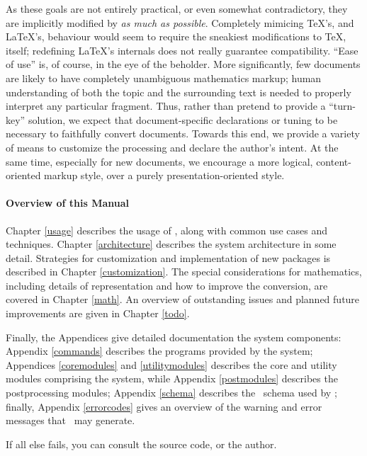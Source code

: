\documentclass{book}
\begin{document}
As these goals are not entirely practical, or even somewhat contradictory,
they are implicitly modified by \emph{as much as possible}.
Completely mimicing \TeX's, and \LaTeX's, behaviour would seem to require the
sneakiest modifications to \TeX, itself; redefining \LaTeX's internals does 
not really guarantee compatibility. ``Ease of use'' is, of course, in the eye of the beholder.
More significantly, few documents are likely to have completely unambiguous
mathematics markup; human understanding of both the topic and the surrounding 
text is needed to properly interpret any particular fragment.
Thus, rather than pretend to provide a ``turn-key'' solution,
we expect that document-specific declarations or tuning to be necessary
to faithfully convert documents.  Towards this end, we provide a variety
of means to customize the processing and declare the author's intent.
At the same time, especially for new documents, we encourage a more logical, 
content-oriented markup style, over a purely presentation-oriented style.

\paragraph[Overview]{Overview of this Manual}
Chapter \ref{usage} describes the usage of \LaTeXML, along with
common use cases and techniques.  Chapter \ref{architecture} describes
the system architecture in some detail. Strategies for customization
and implementation of new packages is described in Chapter \ref{customization}.
The special considerations for mathematics, including details of representation
and how to improve the conversion, are covered in Chapter \ref{math}.
An overview of outstanding issues and planned future improvements
are given in Chapter \ref{todo}.

Finally, the Appendices give detailed documentation the system components:
Appendix \ref{commands} describes the programs provided by the system;
Appendices \ref{coremodules} and \ref{utilitymodules} describes the core and utility modules 
comprising the system, while Appendix \ref{postmodules} describes the postprocessing modules;
Appendix \ref{schema} describes the \XML\ schema used by \LaTeXML;
finally, Appendix \ref{errorcodes} gives an overview of the warning and
error messages that \LaTeXML\ may generate.

If all else fails, you can consult the source code, or the author.

\end{document}
